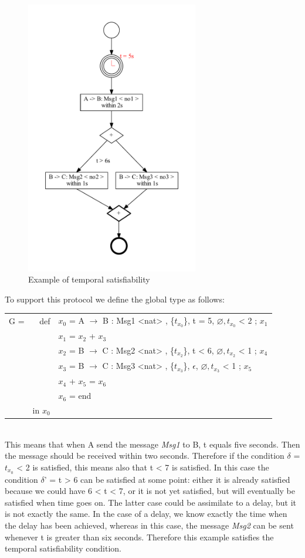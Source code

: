 \documentclass[a4paper,11pt,twoside]{report}
\begin{document}
\begin{figure}[h]
\begin{center}
\includegraphics[height=12cm]{TestTemporalSatisfiability}\caption{Example of temporal satisfiability}\label{fig:ts}
\end{center}
\end{figure}

To support this protocol we define the global type as follows:\\
\begin{tabular}{lrl}
G = & def & $x_0$ = A $\rightarrow$ B : Msg1 <nat> , \{$t_{x_{0}}$\}, t = 5, $\varnothing, t_{x_0}$ < 2  ;  $x_1$\\
&& $x_1$ = $x_2$ + $x_3$ \\
&& $x_2$ = B $\rightarrow$ C : Msg2 <nat> , \{$t_{x_2}$\}, t < 6, $\varnothing, t_{x_2}$ < 1  ;  $x_4$\\
&& $x_3$ = B $\rightarrow$ C : Msg3 <nat> , \{$t_{x_3}$\}, $\epsilon$, $\varnothing, t_{x_3}$ < 1  ;  $x_5$\\
&& $x_4$ + $x_5$ = $x_6$ \\
&& $x_6$ = end\\
& in $x_0$ &\\
\end{tabular}\\
This means that when A send the message \emph{Msg1} to B, t equals five seconds. Then the message should be received within two seconds. Therefore if the condition $\delta$ = $t_{x_0}$ < 2 is satisfied, this means also that t < 7 is satisfied. In this case the condition $\delta$' = t > 6 can be satisfied at some point: either it is already satisfied because we could have 6 < t < 7, or it is not yet satisfied, but will eventually be satisfied when time goes on. The latter case could be assimilate to a delay, but it is not exactly the same. In the case of a delay, we know exactly the time when the delay has been achieved, whereas in this case, the message \emph{Msg2} can be sent whenever t is greater than six seconds. Therefore this example satisfies the temporal satisfiability condition.
\end{document}
